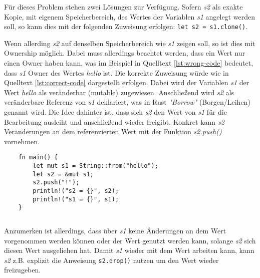 Für dieses Problem stehen zwei Lösungen zur Verfügung. Sofern \textit{s2} als exakte Kopie, mit eigenem Speicherbereich, des Wertes der Variablen \textit{s1} angelegt werden soll, so kann dies mit der folgenden Zuweisung erfolgen: \texttt{let s2 = s1.clone()}.\autocite{rust-ownership}\autocite{rust-the-book}\autocite{rust-by-example}

Wenn allerding \textit{s2} auf denselben Speicherbereich wie \textit{s1} zeigen soll, so ist dies mit Ownership möglich. Dabei muss allerdings beachtet werden, dass ein Wert nur einen Owner haben kann, was im Beispiel in Quelltext \ref{lst:wrong-code} bedeutet, dass \textit{s1} Owner des Wertes \textit{hello} ist. Die korrekte Zuweisung würde wie in Quelltext \ref{lst:correct-code} dargestellt erfolgen. Dabei wird der Variablen \textit{s1} der Wert \textit{hello} als veränderbar (mutable) zugewiesen. Anschließend wird \textit{s2} als veränderbare Referenz von \textit{s1} deklariert, was in Rust \textit{"Borrow"} (Borgen/Leihen) genannt wird. Die Idee dahinter ist, dass sich \textit{s2} den Wert von \textit{s1} für die Bearbeitung ausleiht und anschließend wieder freigibt. Konkret kann \textit{s2} Veränderungen an dem referenzierten Wert mit der Funktion \textit{s2.push()} vornehmen.

\begin{verbatim}
    fn main() {
        let mut s1 = String::from("hello");
        let s2 = &mut s1;
        s2.push("!");
        println!("s2 = {}", s2);
        println!("s1 = {}", s1);
    }
\end{verbatim}
\begin{lstlisting}[caption={Korrekte Zuweisung von Werten \\Quelle: \autocite{rust-ownership}}, label={lst:correct-code}]
\end{lstlisting}

Anzumerken ist allerdings, dass über \textit{s1} keine Änderungen an dem Wert vorgenommen werden können oder der Wert genutzt werden kann, solange \textit{s2} sich diesen Wert ausgeliehen hat. Damit \textit{s1} wieder mit dem Wert arbeiten kann, kann \textit{s2} z.B. explizit die Anweisung \texttt{s2.drop()} nutzen um den Wert wieder freizugeben.\autocite{rust-ownership}\autocite{rust-the-book}\autocite{rust-by-example}